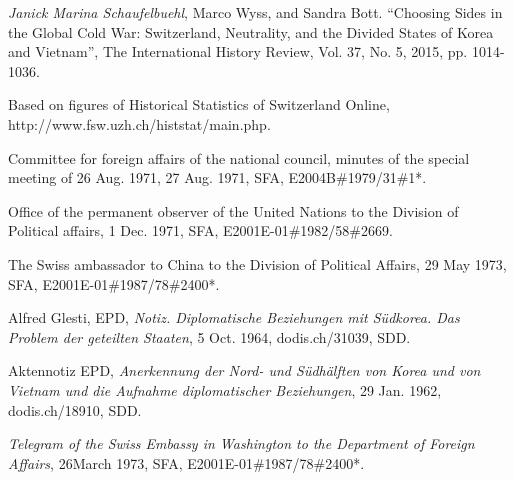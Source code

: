 \documentclass[a4paper]{article}
\begin{document}
\begin{thebibliography}{9}
\emph{Janick Marina Schaufelbuehl}, Marco Wyss, and Sandra Bott. “Choosing Sides in the Global Cold War: Switzerland, Neutrality, and the Divided States of Korea and Vietnam”, The International History Review, Vol. 37, No. 5, 2015, pp. 1014-1036.

Based on figures of Historical Statistics of Switzerland Online, http://www.fsw.uzh.ch/histstat/main.php.

Committee for foreign affairs of the national council, minutes of the special meeting of 26 Aug. 1971, 27 Aug. 1971, SFA, E2004B\#1979/31\#1*.

Office of the permanent observer of the United Nations to the Division of Political affairs, 1 Dec. 1971, SFA, E2001E-01\#1982/58\#2669.

The Swiss ambassador to China to the Division of Political Affairs, 29 May 1973, SFA, E2001E-01\#1987/78\#2400*.

Alfred Glesti, EPD, \emph{Notiz. Diplomatische Beziehungen mit Südkorea. Das Problem der geteilten Staaten}, 5 Oct. 1964, dodis.ch/31039, SDD.

Aktennotiz EPD, \emph{Anerkennung der Nord- und Südhälften von Korea und von Vietnam und die Aufnahme diplomatischer Beziehungen}, 29 Jan. 1962, dodis.ch/18910, SDD.

\emph{Telegram of the Swiss Embassy in Washington to the Department of Foreign Affairs}, 26March 1973, SFA, E2001E-01\#1987/78\#2400*.




\end{thebibliography}
\end{document}

